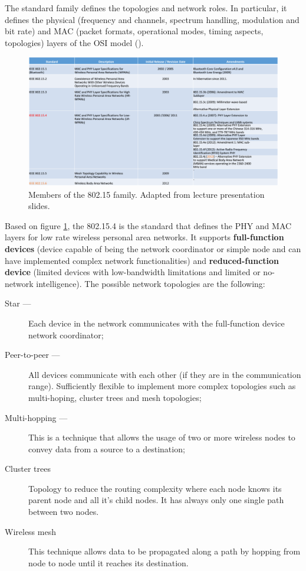 The standard family defines the topologies and network roles. In particular, it defines the physical (frequency and channels, spectrum handling, modulation and bit rate) and MAC (packet formats, operational modes, timing aspects, topologies) layers of the OSI model (\cite{Hackmann2006}).


\begin{figure}[h!]
	\centering
	\includegraphics[width=1.1\textwidth,keepaspectratio]{figures/nancy2014}
	\caption{Members of the 802.15 family. Adapted from \cite{nancy2014} lecture presentation slides.}
	\label{fig:nancy2014}
\end{figure}

Based on figure \ref{fig:nancy2014}, the 802.15.4 is the standard that defines the PHY and MAC layers for low rate wireless personal area networks. It supports \textbf{full-function devices} (device capable of being the network coordinator or simple node and can have implemented complex network functionalities) and \textbf{reduced-function device} (limited devices with low-bandwidth limitations and limited or no-network intelligence). The possible network topologies are the following:

\begin{description}
	\item[Star ---] Each device in the network communicates with the full-function device network coordinator;
	
	\item[Peer-to-peer ---] All devices communicate with each other (if they are in the communication range). Sufficiently flexible to implement more complex topologies such as multi-hoping, cluster trees and mesh topologies;
	
	\item[Multi-hopping ---] This is a technique that allows the usage of two or more wireless nodes to convey data from a source to a destination;
	
	\item[Cluster trees] Topology to reduce the routing complexity where each node knows its parent node and all it's child nodes. It has always only one single path between two nodes.
	
	\item[Wireless mesh] This technique allows data to be propagated along a path by hopping from node to node until it reaches its destination.
	
\end{description}


